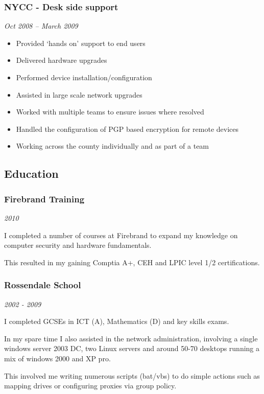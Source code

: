 \subsubsection{NYCC - Desk side support}

\emph{Oct 2008 -- March 2009}

\begin{itemize}
\item
  Provided `hands on' support to end users
\item
  Delivered hardware upgrades
\item
  Performed device installation/configuration
\item
  Assisted in large scale network upgrades
\item
  Worked with multiple teams to ensure issues where resolved
\item
  Handled the configuration of PGP based encryption for remote devices
\item
  Working across the county individually and as part of a team
\end{itemize}

\subsection{Education}

\subsubsection{Firebrand Training}

\emph{2010}

I completed a number of courses at Firebrand to expand my knowledge on
computer security and hardware fundamentals.

This resulted in my gaining Comptia A+, CEH and LPIC level 1/2
certifications.

\subsubsection{Rossendale School}

\emph{2002 - 2009}

I completed GCSEs in ICT (A), Mathematics (D) and key skills exams.

In my spare time I also assisted in the network administration,
involving a single windows server 2003 DC, two Linux servers and around
50-70 desktops running a mix of windows 2000 and XP pro.

This involved me writing numerous scripts (bat/vbs) to do simple actions
such as mapping drives or configuring proxies via group policy.


